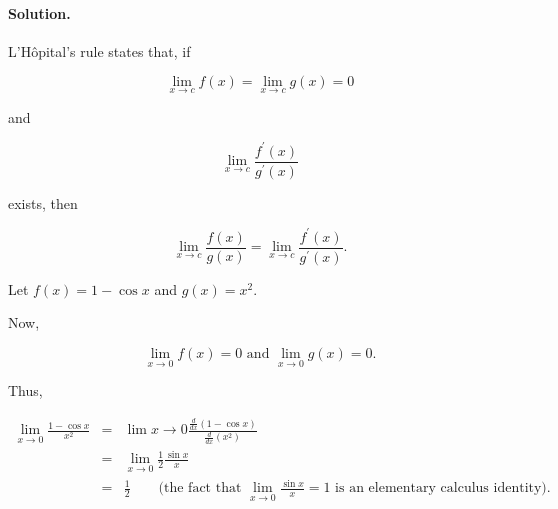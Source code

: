 

\paragraph{Solution.}

L'H\^{o}pital's rule states that, if

\[\lim_{x\to c}f\left(x\right)=\lim_{x\to c}g\left(x\right)=0\]

and

\[\lim_{x\to c}\frac{f^\prime\left(x\right)}{g^\prime\left(x\right)}\]

exists, then

\[\lim_{x\to c}\frac{f\left(x\right)}{g\left(x\right)}=\lim_{x\to c}\frac{f^\prime\left(x\right)}{g^\prime\left(x\right)}.\]

Let $f\left(x\right)=1-\cos x$ and $g\left(x\right)=x^2$.

Now,

\[\lim_{x\to0}f\left(x\right)=0\mbox{ and }\lim_{x\to0}g\left(x\right)=0.\]

Thus,

\begin{eqnarray*}
	\lim_{x\to0}\frac{1-\cos x}{x^2}&=&\lim{x\to0}\frac{\frac{d}{dx}\left(1-\cos x\right)}{\frac{d}{dx}\left(x^2\right)}\\
	&=&\lim_{x\to0}\frac{1}{2}\frac{\sin x}{x}\\
	&=&\frac{1}{2}\qquad\mbox{(the fact that }\lim_{x\to0}\frac{\sin x}{x}=1\mbox{ is an elementary calculus identity).}
\end{eqnarray*}
